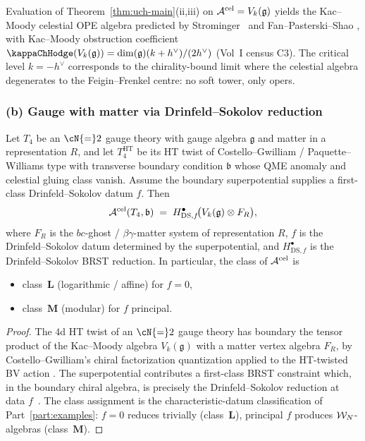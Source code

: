 Evaluation of Theorem~\ref{thm:uch-main}(ii,iii) on
$\mathcal A^{\mathrm{cel}} = V_k(\mathfrak g)$ yields the Kac--Moody
celestial OPE algebra predicted by
Strominger~\cite{StromingerWInfinityCelestial} and Fan--Pasterski--Shao
\cite{FanPasterskiShaoCelOPE}, with Kac--Moody obstruction coefficient
$\kap(V_k(\mathfrak g)) = \dim(\mathfrak g) (k + h^\vee)/(2 h^\vee)$
(Vol~I census C3). The critical level $k = -h^\vee$ corresponds to
the chirality-bound limit where the celestial algebra degenerates to
the Feigin--Frenkel centre: no soft tower, only opers.

\subsubsection*{(b) Gauge with matter via Drinfeld--Sokolov reduction}

\begin{proposition}[Celestial chiral algebra of $\cN{=}2$ gauge theory
via DS]
\label{prop:uch-ds-matter}
Let $T_4$ be an $\cN{=}2$ gauge theory with gauge algebra
$\mathfrak g$ and matter in a representation $R$, and let
$T_4^{\mathrm{HT}}$ be its HT twist of Costello--Gwilliam /
Paquette--Williams type with transverse boundary condition
$\mathfrak b$ whose QME anomaly and celestial gluing class vanish.
Assume the boundary superpotential supplies a first-class
Drinfeld--Sokolov datum $f$. Then
\[
\mathcal A^{\mathrm{cel}}(T_4,\mathfrak b) \;=\; H^\bullet_{\mathrm{DS},f}\!\bigl(V_k(\mathfrak g)
\otimes F_R\bigr),
\]
where $F_R$ is the $bc$-ghost / $\beta\gamma$-matter system of
representation $R$, $f$ is the Drinfeld--Sokolov datum determined by
the superpotential, and $H^\bullet_{\mathrm{DS},f}$ is the
Drinfeld--Sokolov BRST reduction. In particular, the class of
$\mathcal A^{\mathrm{cel}}$ is
\begin{itemize}
\item class~$\mathbf L$ (logarithmic / affine) for $f = 0$,
\item class~$\mathbf M$ (modular) for $f$ principal.
\end{itemize}
\end{proposition}

\begin{proof}
The $4$d HT twist of an $\cN{=}2$ gauge theory has boundary the
tensor product of the Kac--Moody algebra $V_k(\mathfrak g)$ with a
matter vertex algebra $F_R$, by Costello--Gwilliam's chiral
factorization quantization applied to the HT-twisted BV action
\cite{CostelloGwilliamVolI, CostelloGwilliamVolII}. The
superpotential contributes a first-class BRST constraint which, in
the boundary chiral algebra, is precisely the Drinfeld--Sokolov
reduction at data $f$~\cite[\S 5]{PaquetteWilliamsHT}. The class
assignment is the characteristic-datum classification of
Part~\ref{part:examples}: $f=0$ reduces trivially (class~$\mathbf L$),
principal $f$ produces $\mathcal W_N$-algebras (class~$\mathbf M$).
\end{proof}

